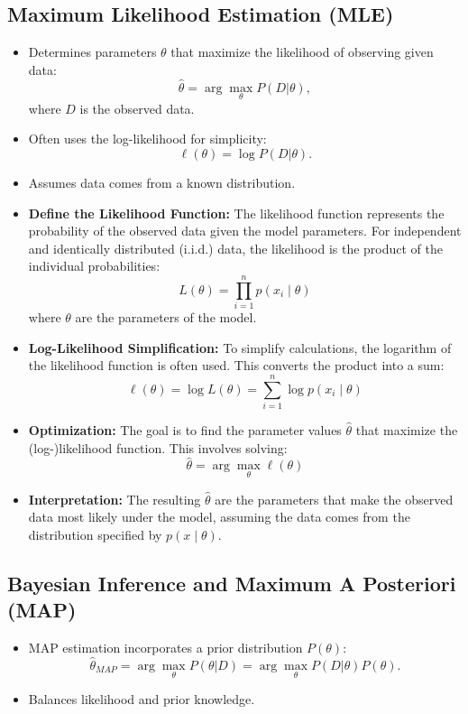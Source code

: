 \documentclass[12pt,a4paper]{article}
\begin{document}
\subsection{Maximum Likelihood Estimation (MLE)}
\begin{itemize}
    \item Determines parameters $\theta$ that maximize the likelihood of observing given data:
    \[ \hat{\theta} = \arg\max_{\theta} P(D | \theta), \]
    where $D$ is the observed data.
    \item Often uses the log-likelihood for simplicity:
    \[ \ell(\theta) = \log P(D | \theta). \]
    \item Assumes data comes from a known distribution.
\end{itemize}
\begin{itemize}
    \item \textbf{Define the Likelihood Function:} The likelihood function represents the probability of the observed data given the model parameters. For independent and identically distributed (i.i.d.) data, the likelihood is the product of the individual probabilities: 
    \[
    L(\theta) = \prod_{i=1}^n p(x_i \mid \theta)
    \]
    where \( \theta \) are the parameters of the model.

    \item \textbf{Log-Likelihood Simplification:} To simplify calculations, the logarithm of the likelihood function is often used. This converts the product into a sum:
    \[
    \ell(\theta) = \log L(\theta) = \sum_{i=1}^n \log p(x_i \mid \theta)
    \]

    \item \textbf{Optimization:} The goal is to find the parameter values \( \hat{\theta} \) that maximize the (log-)likelihood function. This involves solving:
    \[
    \hat{\theta} = \arg \max_\theta \ell(\theta)
    \]

    \item \textbf{Interpretation:} The resulting \( \hat{\theta} \) are the parameters that make the observed data most likely under the model, assuming the data comes from the distribution specified by \( p(x \mid \theta) \).
\end{itemize}


\subsection{Bayesian Inference and Maximum A Posteriori (MAP)}
\begin{itemize}
    \item MAP estimation incorporates a prior distribution $P(\theta)$:
    \[ \hat{\theta}_{MAP} = \arg\max_{\theta} P(\theta | D) = \arg\max_{\theta} P(D | \theta) P(\theta). \]
    \item Balances likelihood and prior knowledge.
\end{itemize}
\end{document}
